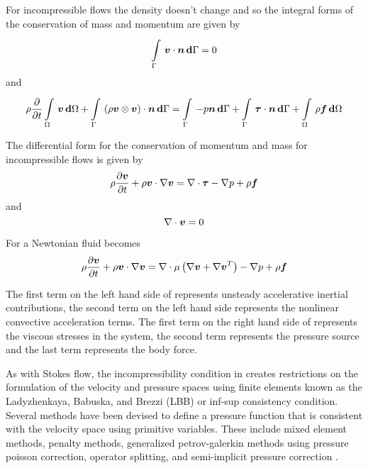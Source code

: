 For incompressible flows the density doesn't change and so the integral forms
of the conservation of mass and momentum are given by
\begin{equation}
    \displaystyle\int\limits_{\Gamma}^{} \,\boldsymbol{v}\cdot\boldsymbol{n}\, \boldsymbol{\mathrm{d}} \Gamma =0
\end{equation}
and
\begin{equation}
  \rho \dfrac{\partial }{\partial t}   \displaystyle\int\limits_{\Omega}^{} \,\boldsymbol{v}\, \boldsymbol{\mathrm{d}} \Omega 
  +  \displaystyle\int\limits_{\Gamma}^{} \,\left(  \rho\boldsymbol{v} \otimes \boldsymbol{v}  \right)\cdot\boldsymbol{n}\, \boldsymbol{\mathrm{d}} \Gamma 
  =  \displaystyle\int\limits_{\Gamma}^{} \,-p\boldsymbol{n}\, \boldsymbol{\mathrm{d}} \Gamma +  \displaystyle\int\limits_{\Gamma}^{} \,\boldsymbol{\mathit{\tau}}\cdot\boldsymbol{n}\, \boldsymbol{\mathrm{d}} \Gamma 
  +  \displaystyle\int\limits_{\Omega}^{} \,\rho\boldsymbol{f}\, \boldsymbol{\mathrm{d}} \Omega 
\end{equation}

The differential form for the conservation of momentum and mass for
incompressible flows is given by
\begin{equation}
  \rho\delby{\vectr{v}}{t}+\dotprod{\rho\vectr{v}}{\gradient{}{\vectr{v}}}
  =\divergence{}{\tensor{\tau}}-\gradient{}{p}+\rho\vectr{f}
  \label{eqn:DiffIncompNSEMomentum}
\end{equation}
and
\begin{equation}
  \divergence{}{\vectr{v}}=0
  \label{eqn:DiffIncompNSEMass}
\end{equation}

For a Newtonian fluid  becomes
\begin{equation}
  \rho\delby{\vectr{v}}{t}+\dotprod{\rho\vectr{v}}{\gradient{}{\vectr{v}}}
  =\divergence{}{\mu\pbrac{\gradient{}{\vectr{v}+\transpose{\gradient{}{\vectr{v}}}}}}-\gradient{}{p}+\rho\vectr{f}
  \label{eqn:DiffIncompNewtonianNSEMomentum}
\end{equation}

The first term on the left hand side of 
represents unsteady accelerative inertial contributions, the second term on
the left hand side represents the nonlinear convective acceleration terms. The
first term on the right hand side of 
represents the viscous stresses in the system, the second term represents the
pressure source and the last term represents the body force.

As with Stokes flow, the incompressibility condition in
 creates restrictions on the formulation of
the velocity and pressure spaces using finite elements known as the
Ladyzhenkaya, Babuska, and Brezzi (LBB) or inf-sup consistency
condition. Several methods have been devised to define a pressure function
that is consistent with the velocity space using primitive variables. These
include mixed element methods, penalty methods, generalized petrov-galerkin
methods using pressure poisson correction, operator splitting, and
semi-implicit pressure correction \cite{chung:2010}.

